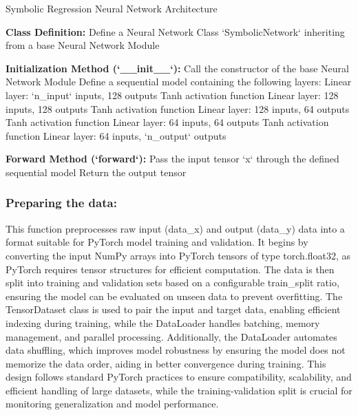 \documentclass{article}
\begin{document}
\begin{algorithm}[H]
\SetAlgoLined
\caption{Symbolic Regression Neural Network Architecture}
\label{alg:symbolic_network} %

\textbf{Class Definition:}\;
Define a Neural Network Class `SymbolicNetwork` inheriting from a base Neural Network Module\;

\textbf{Initialization Method (`__init__`):}\;
\;
Call the constructor of the base Neural Network Module\;
Define a sequential model containing the following layers:\;
\Indp %
Linear layer: `n_input` inputs, 128 outputs\;
Tanh activation function\;
Linear layer: 128 inputs, 128 outputs\;
Tanh activation function\;
Linear layer: 128 inputs, 64 outputs\;
Tanh activation function\;
Linear layer: 64 inputs, 64 outputs\;
Tanh activation function\;
Linear layer: 64 inputs, `n_output` outputs\;
\Indm %

\textbf{Forward Method (`forward`):}\;
\;
\;
Pass the input tensor `x` through the defined sequential model\;
Return the output tensor\;

\end{algorithm}







\subsubsection{Preparing the data:}

This function preprocesses raw input (data_x) and output (data_y) data into a format suitable for PyTorch model training and validation. It begins by converting the input NumPy arrays into PyTorch tensors of type torch.float32, as PyTorch requires tensor structures for efficient computation. The data is then split into training and validation sets based on a configurable train_split ratio, ensuring the model can be evaluated on unseen data to prevent overfitting. The TensorDataset class is used to pair the input and target data, enabling efficient indexing during training, while the DataLoader handles batching, memory management, and parallel processing. Additionally, the DataLoader automates data shuffling, which improves model robustness by ensuring the model does not memorize the data order, aiding in better convergence during training. This design follows standard PyTorch practices to ensure compatibility, scalability, and efficient handling of large datasets, while the training-validation split is crucial for monitoring generalization and model performance.\\
\end{document}
